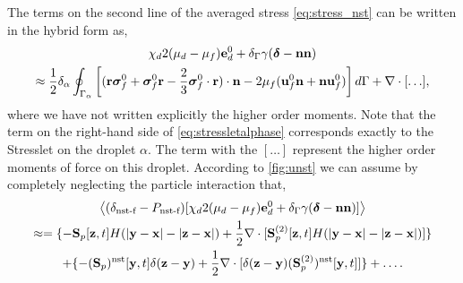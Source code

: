 The terms on the second line of the averaged stress \eqref{eq:stress_nst} can be written in the hybrid form as, 
\begin{multline}
    {\chi_d  2 (\mu_d-\mu_f)\textbf{e}_d^0 
    + \delta_\Gamma \gamma (\bm\delta - \textbf{nn})}\\
    \approx
    \frac{1}{2}
     \delta_\alpha\intS{
        \left[(\textbf{r}\bm\sigma_f^0 
        + \bm\sigma_f^0 \textbf{r}
        - \frac{2}{3}\bm\sigma_f^0 \cdot \textbf{r}
        )\cdot \textbf{n} 
        - 2\mu_f (
            \textbf{u}_f^0 \textbf{n}
            + \textbf{n}\textbf{u}_f^0 
        )\right]
    }
    + \div[\ldots],
    \label{eq:stressletalphase}
\end{multline}
where we have not written explicitly the higher order moments. 
Note that the term on the right-hand side of \ref{eq:stressletalphase} corresponds exactly to the Stresslet on the droplet $\alpha$.
The term with the $[\ldots]$ represent the higher order moments of force on this droplet. 
According to \ref{fig:unst} we can assume by completely neglecting the particle interaction that, 
\begin{multline}
    \avg{(\delta_\text{nst-f} - P_\text{nst-f})[\chi_d  2 (\mu_d-\mu_f)\textbf{e}_d^0 
    + \delta_\Gamma \gamma (\bm\delta - \textbf{nn})]} \\
    \approx
    = \{
        -\textbf{S}_p[\textbf{z},t]
        H(|\textbf{y}- \textbf{x}| - |\textbf{z} -\textbf{x}|)
        +
        \frac{1}{2}\div[\textbf{S}_p^{(2)}[\textbf{z},t]H(|\textbf{y}- \textbf{x}| - |\textbf{z} -\textbf{x}|)]\}\\
    + 
    \{
        -(\textbf{S}_p)^\text{nst}[\textbf{y},t]
        \delta(\textbf{z}-\textbf{y})
        +\frac{1}{2}\div[\delta(\textbf{z}-\textbf{y})(\textbf{S}_p^{(2)})^\text{nst}[\textbf{y},t]]
    \}
    + \ldots.
    \label{eq:equivalent_stress2NST}
\end{multline}
